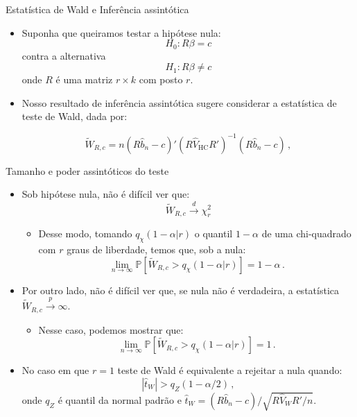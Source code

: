 \documentclass[11pt]{beamer}
\begin{document}
	\begin{frame}{Estatística de Wald e Inferência assintótica}
	\begin{itemize}
		\item Suponha que queiramos testar a hipótese nula:
		$$H_0: R \beta = c$$
		contra a alternativa 
		$$H_1: R\beta \neq c$$
		onde $R$  é uma matriz $r \times k$ com posto $r$.
		\item Nosso resultado de inferência assintótica sugere considerar {\color{blue}a estatística de teste de Wald}, dada por:
		
		$$\tilde{W}_{R,c} = n(R\hat{b}_n-c)'\left(R\hat{V}_{\text{HC}} R'\right)^{-1}(R\hat{b}_n-c)\, , $$
	\end{itemize}
	\end{frame}
	\begin{frame}{Tamanho e poder assintóticos do teste}
\begin{itemize}
	  \item Sob hipótese nula, não é difícil ver que:
	$$\tilde{W}_{R,c}  \overset{d}{\to} \chi^2_r$$
	\vspace{-1em}
	\begin{itemize}
		\item Desse modo, tomando $q_\chi(1-\alpha|r)$ o quantil $1-\alpha$ de uma chi-quadrado com $r$ graus de liberdade, temos que, sob a nula:
		$$\lim_{n \to\infty}\mathbb{P}\left[\tilde{W}_{R,c}  > q_\chi(1-\alpha|r)\right]=1-\alpha\, .$$
	\end{itemize}
	\item Por outro lado, não é difícil ver que, se nula {\color{blue}não é verdadeira}, a estatística $\tilde{W}_{R,c} \overset{p}{\to}\infty$.
	\begin{itemize}
		\item Nesse caso, podemos mostrar que:
		$$\lim_{n \to\infty}\mathbb{P}\left[\tilde{W}_{R,c}  > q_\chi(1-\alpha|r)\right] = 1\, .$$
	\end{itemize}
	\item No caso em que $r=1$ teste de Wald é equivalente a rejeitar a nula quando:
	$$|\hat{t}_W| > q_Z(1-\alpha/2)\, ,$$
	onde $q_Z$ é quantil da normal padrão e  $\hat{t}_W = (R\hat{b}_n-c)/\sqrt{R\hat{V}_W R'/n}$.
\end{itemize}
	\end{frame}
\end{document}
